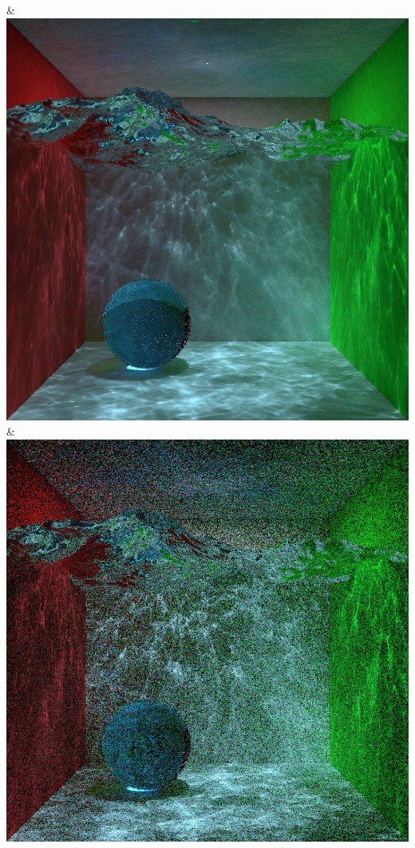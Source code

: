 & \includegraphics[width=\linewidth]{figures/py/tests/quality_comparison/nrc+sppc_1spp_caustics_small.png}
& \includegraphics[width=\linewidth]{figures/py/tests/quality_comparison/sppm_1spp_caustics_small.png}
